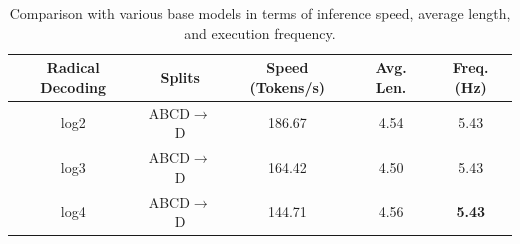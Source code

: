 \begin{table}[t]
\setlength{\tabcolsep}{4pt}
\renewcommand{\arraystretch}{0.9}
\centering
\small
\caption{Comparison with various base models in terms of inference speed, average length, and execution frequency.}
\label{tab:baselines}

\begin{tabular}{@{} c c c c c @{}}
\toprule
Radical Decoding
& Splits 
& Speed (Tokens/s) 
& Avg. Len. 
& Freq. (Hz) \\
\midrule

log2
& ABCD$\rightarrow$D 
& 186.67 
& 4.54 
& 5.43 \\

log3 
& ABCD$\rightarrow$D 
& 164.42
& 4.50
& 5.43  \\

log4
& ABCD$\rightarrow$D 
& 144.71 
& 4.56     
& \textbf{5.43} \\

\bottomrule
\end{tabular}

\vspace{-0.2cm}
\end{table}
